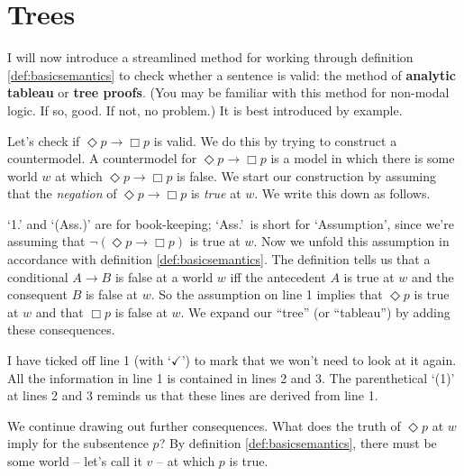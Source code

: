 \section{Trees}\label{sec:trees}

I will now introduce a streamlined method for working through definition
\ref{def:basicsemantics} to check whether a sentence is valid: the method of
\textbf{analytic tableau} or \textbf{tree proofs}. (You may be familiar with
this method for non-modal logic. If so, good. If not, no problem.) It is best
introduced by example.

Let's check if $\Diamond p \to \Box p$ is valid. We do this by trying to
construct a countermodel. A countermodel for $\Diamond p \to \Box p$ is a model
in which there is some world $w$ at which $\Diamond p\to \Box p$ is false. We
start our construction by assuming that the \emph{negation} of
$\Diamond p \to \Box p$ is \emph{true} at $w$. We write this down as follows.

\begin{center}
\end{center}
%
`1.' and `(Ass.)' are for book-keeping; `Ass.'\ is short for `Assumption', since
we're assuming that $\neg(\Diamond p \to \Box p)$ is true at $w$. Now we
unfold this assumption in accordance with definition \ref{def:basicsemantics}.
The definition tells us that a conditional $A\to B$ is false at a world $w$ iff
the antecedent $A$ is true at $w$ and the consequent $B$ is false at $w$. So the
assumption on line 1 implies that $\Diamond p$ is true at $w$ and that $\Box p$
is false at $w$. We expand our ``tree'' (or ``tableau'') by adding these consequences.

\begin{center}
\end{center}
%
I have ticked off line 1 (with `$\checkmark$') to mark that we won't need to
look at it again. All the information in line 1 is contained in lines 2 and 3.
The parenthetical `(1)' at lines 2 and 3 reminds us that these lines are
derived from line 1.

We continue drawing out further consequences. What does the truth of
$\Diamond p$ at $w$ imply for the subsentence $p$? By definition
\ref{def:basicsemantics}, there must be some world -- let's call it $v$ -- at
which $p$ is true.

